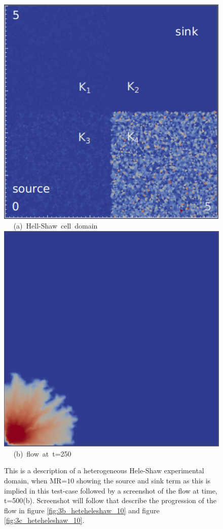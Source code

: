 \begin{figure}[ht] 
\vbox{
\hbox{\hspace{2.5cm}
\includegraphics[width=.6\textwidth]{./Pics1/Saffman_heterogeneous/saffman_heter_fixed_1.pdf} 
}
\vspace{0.0cm}
\hbox{\hspace{4.5cm} (a) Hell-Shaw cell domain   
}
\vspace{0.25cm}
\hbox{\hspace{2.5cm}
\includegraphics[width=.6\textwidth]{./Pics1/Saffman_heterogeneous/saffman_heter_fixed_500.pdf}
}
\vspace{0.0cm}
\hbox{\hspace{5.0cm} (b) flow at t=250     
}
}     
\caption{This is a description of a heterogeneous Hele-Shaw experimental domain, when MR=$10$ showing the source and sink term as this is implied in this test-case followed by a screenshot of the flow at time, t=500(b). Screenshot will follow that describe the progression of the flow in figure \ref{fig:3b_heteheleshaw_10} and figure \ref{fig:3c_heteheleshaw_10}.}
\label{fig:3a_heteheleshaw_10}
\end{figure}
\clearpage

